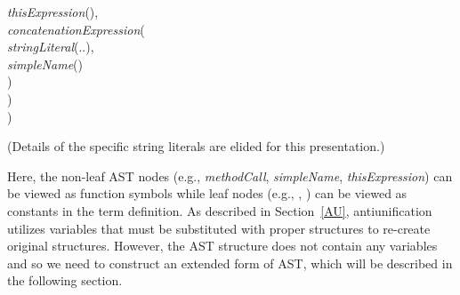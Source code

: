 \begin{itemize} [leftmargin=0.7in]
\hspace*{2em}\textit{thisExpression}(),\\
\hspace*{2em}\textit{concatenationExpression}(\\
\hspace*{3em}\textit{stringLiteral}(..),\\
\hspace*{3em}\textit{simpleName}()\\
\hspace*{2em})\\
\hspace*{1em})\\
)
\end{itemize}
(Details of the specific string literals are elided for this presentation.)

Here, the non-leaf AST nodes (e.g., \textit{methodCall}, \textit{simpleName}, \textit{thisExpression}) can be viewed as function symbols while leaf nodes (e.g., , ) can be viewed as constants in the term definition. As described in Section~\ref{AU}, antiunification utilizes variables that must be substituted with proper structures to re-create original structures. However, the AST structure does not contain any variables and so we need to construct an extended form of AST, which will be described in the following section.


